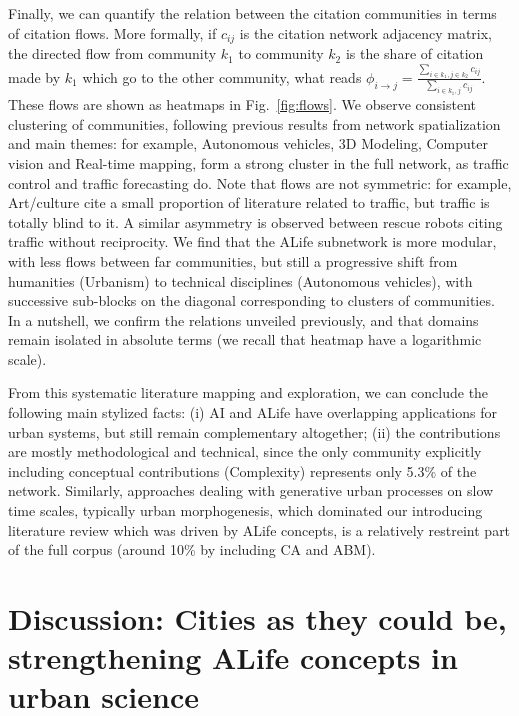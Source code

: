 \documentclass[10pt]{article}
\begin{document}
Finally, we can quantify the relation between the citation communities in terms of citation flows. More formally, if $c_{ij}$ is the citation network adjacency matrix, the directed flow from community $k_1$ to community $k_2$ is the share of citation made by $k_1$ which go to the other community, what reads $\phi_{i \rightarrow j} = \frac{\sum_{i\in k_1,j\in k_2} c_{ij}}{\sum_{i\in k_1,j} c_{ij}}$. These flows are shown as heatmaps in Fig.~\ref{fig:flows}. We observe consistent clustering of communities, following previous results from network spatialization and main themes: for example, Autonomous vehicles, 3D Modeling, Computer vision and Real-time mapping, form a strong cluster in the full network, as traffic control and traffic forecasting do. Note that flows are not symmetric: for example, Art/culture cite a small proportion of literature related to traffic, but traffic is totally blind to it. A similar asymmetry is observed between rescue robots citing traffic without reciprocity. We find that the ALife subnetwork is more modular, with less flows between far communities, but still a progressive shift from humanities (Urbanism) to technical disciplines (Autonomous vehicles), with successive sub-blocks on the diagonal corresponding to clusters of communities. In a nutshell, we confirm the relations unveiled previously, and that domains remain isolated in absolute terms (we recall that heatmap have a logarithmic scale).


From this systematic literature mapping and exploration, we can conclude the following main stylized facts: (i) AI and ALife have overlapping applications for urban systems, but still remain complementary altogether; (ii) the contributions are mostly methodological and technical, since the only community explicitly including conceptual contributions (Complexity) represents only 5.3\% of the network. Similarly, approaches dealing with generative urban processes on slow time scales, typically urban morphogenesis, which dominated our introducing literature review which was driven by ALife concepts, is a relatively restreint part of the full corpus (around 10\% by including CA and ABM).







\section{Discussion: Cities as they could be, strengthening ALife concepts in urban science}
\end{document}
